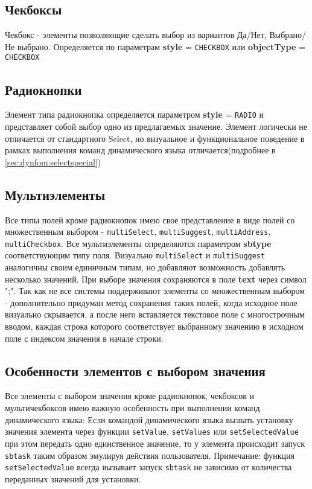 \documentclass[../index.tex]{subfiles}
\begin{document}
\subsection{Чекбоксы}
	Чекбокс - элементы позволяющие сделать выбор из вариантов Да/Нет, Выбрано/Не выбрано.
	Определяется по параметрам \textbf{style} = \verb|CHECKBOX| или \textbf{objectType} = \verb|CHECKBOX|
\subsection{Радиокнопки}
	Элемент типа радиокнопка определяется параметром \textbf{style} = \verb|RADIO| и представляет собой выбор одно из предлагаемых значение.
	Элемент логически не отличается от стандартного Select, но визуальное и функциональное поведение в рамках выполнения команд динамического языка отличается(подробнее в \autoref{sec:dynfom:selectspecial})
\subsection{Мультиэлементы}
	Все типы полей кроме радиокнопок имею свое представление в виде полей со множественным выбором -  \verb|multiSelect|, \verb|multiSuggest|, \verb|multiAddress|, \verb|multiCheckbox|.
	Все мультиэлементы определяются параметром \textbf{sbtype} соответствующим типу поля. Визуально \verb|multiSelect| и \verb|multiSuggest| аналогичны своим единичным типам, но добавляют возможность добавлять несколько значений.
	При выборе значения сохраняются в поле \textbf{text} через символ ";". Так как не все системы поддерживают элементы со множественным выбором - дополнительно придуман метод сохранения таких полей, когда исходное поле визуально скрывается, а после него вставляется текстовое поле с многострочным вводом, каждая строка которого соответствует выбранному значению в исходном поле с индексом значения в начале строки.
\subsection{Особенности элементов с выбором значения}\label{sec:dynfom:selectspecial} 
	Все элементы с выбором значения кроме радиокнопок, чекбоксов и мультичекбоксов имею важную особенность при выполнении команд динамического языка: Если командой динамического языка вызвать установку значения элемента через функции \verb|setValue|, \verb|setValues| или \verb|setSelectedValue| при этом передать одно единственное значение, то у элемента происходит запуск \verb|sbtask| таким образом эмулируя действия пользователя.
	Примечание: функция \verb|setSelectedValue| всегда вызывает запуск \verb|sbtask| не зависимо от количества переданных значений для установки.
\end{document}
